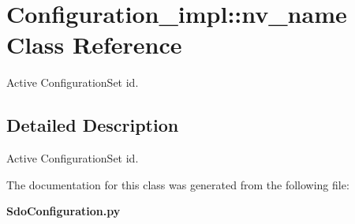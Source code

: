 \section{Configuration\_\-impl::nv\_\-name Class Reference}
\label{classConfiguration__impl_1_1nv__name}
Active Configuration\-Set id.  




\subsection{Detailed Description}
Active Configuration\-Set id. 



The documentation for this class was generated from the following file:\begin{CompactItemize}
\item 
{\bf Sdo\-Configuration.py}\end{CompactItemize}
